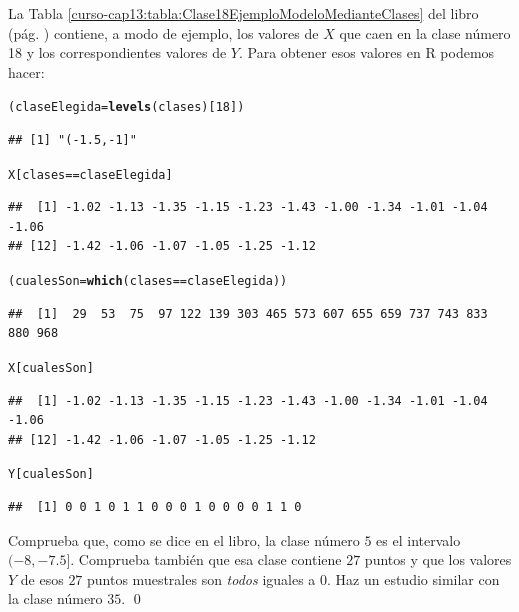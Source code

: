 \documentclass[10pt,a4paper]{article}\usepackage[]{graphicx}\usepackage[]{color}
\makeatletter
\newcommand{\hlnum}[1]{\textcolor[rgb]{0.686,0.059,0.569}{#1}}%
\newcommand{\hlopt}[1]{\textcolor[rgb]{0,0,0}{#1}}%
\newcommand{\hlstd}[1]{\textcolor[rgb]{0.345,0.345,0.345}{#1}}%
\newcommand{\hlkwb}[1]{\textcolor[rgb]{0.69,0.353,0.396}{#1}}%
\newcommand{\hlkwd}[1]{\textcolor[rgb]{0.737,0.353,0.396}{\textbf{#1}}}%
\newenvironment{kframe}{%
 \def\at@end@of@kframe{}%
 \ifinner\ifhmode%
  \def\at@end@of@kframe{\end{minipage}}%
  \begin{minipage}{\columnwidth}%
 \fi\fi%
 \def\FrameCommand##1{\hskip\@totalleftmargin \hskip-\fboxsep
 \colorbox{shadecolor}{##1}\hskip-\fboxsep
     \hskip-\linewidth \hskip-\@totalleftmargin \hskip\columnwidth}%
 \MakeFramed {\advance\hsize-\width
   \@totalleftmargin\z@ \linewidth\hsize
   \@setminipage}}%
 {\par\unskip\endMakeFramed%
 \at@end@of@kframe}
\newenvironment{knitrout}{}{} %
\newcounter {cont01}
\makeatother
\begin{document}
\begin{enumerate}
La Tabla \ref{curso-cap13:tabla:Clase18EjemploModeloMedianteClases} del libro (pág. \pageref{curso-cap13:tabla:Clase18EjemploModeloMedianteClases}) contiene, a modo de ejemplo, los valores de $X$ que caen en la clase número 18 y los correspondientes valores de $Y$. Para obtener esos valores en R podemos hacer:
\begin{knitrout}
\color{fgcolor}\begin{kframe}
\begin{alltt}
\hlstd{(claseElegida} \hlkwb{=} \hlkwd{levels}\hlstd{(clases)[}\hlnum{18}\hlstd{])}
\end{alltt}
\begin{verbatim}
## [1] "(-1.5,-1]"
\end{verbatim}
\begin{alltt}
\hlstd{X[clases} \hlopt{==} \hlstd{claseElegida]}
\end{alltt}
\begin{verbatim}
##  [1] -1.02 -1.13 -1.35 -1.15 -1.23 -1.43 -1.00 -1.34 -1.01 -1.04 -1.06
## [12] -1.42 -1.06 -1.07 -1.05 -1.25 -1.12
\end{verbatim}
\begin{alltt}
\hlstd{(cualesSon} \hlkwb{=} \hlkwd{which}\hlstd{(clases} \hlopt{==} \hlstd{claseElegida))}
\end{alltt}
\begin{verbatim}
##  [1]  29  53  75  97 122 139 303 465 573 607 655 659 737 743 833 880 968
\end{verbatim}
\begin{alltt}
\hlstd{X[cualesSon]}
\end{alltt}
\begin{verbatim}
##  [1] -1.02 -1.13 -1.35 -1.15 -1.23 -1.43 -1.00 -1.34 -1.01 -1.04 -1.06
## [12] -1.42 -1.06 -1.07 -1.05 -1.25 -1.12
\end{verbatim}
\begin{alltt}
\hlstd{Y[cualesSon]}
\end{alltt}
\begin{verbatim}
##  [1] 0 0 1 0 1 1 0 0 0 1 0 0 0 0 1 1 0
\end{verbatim}
\end{kframe}
\end{knitrout}

\begin{ejercicio}
\label{tut13:ejercicio01}
Comprueba que, como se dice en el libro, la clase número $5$ es el intervalo $(-8,-7.5]$. Comprueba también que esa clase contiene $27$ puntos y que los valores $Y$ de esos $27$ puntos muestrales son {\em todos} iguales a $0$. Haz un estudio similar con la clase número $35$.
\qed
\end{ejercicio}



\end{enumerate}
\end{document}
